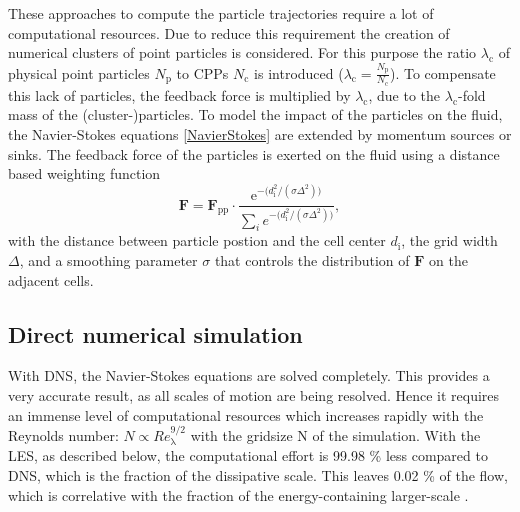 \documentclass[11pt,a4paper,openany,oneside,parskip=half*]{article}
\renewcommand*\vec[1]{\boldsymbol{#1}}
\begin{document}
\newline
These approaches to compute the particle trajectories require a lot of computational resources. 
\newline
Due to reduce this requirement the creation of numerical clusters of point particles is considered. For this purpose the ratio $\lambda_\mathrm{c}$ of physical point particles $N_\mathrm{p}$ to CPPs $N_\mathrm{c}$ is introduced ($\lambda_\mathrm{c} = \frac{N_\mathrm{p}}{N_\mathrm{c}}$). To compensate this lack of particles, the feedback force is multiplied by $\lambda_\mathrm{c}$, due to the $\lambda_\mathrm{c}$-fold mass of the (cluster-)particles.
\newline
To model the impact of the particles on the fluid, the Navier-Stokes equations \eqref{NavierStokes} are extended by momentum sources or sinks. The feedback force of the particles is exerted on the fluid using a distance based weighting function
\begin{equation}
\vec{F} = \vec{F}_\mathrm{pp} \cdot \frac{\mathrm{e}^{- \big(d_\mathrm{i}^\mathrm{2}/(\sigma \Delta^\mathrm{2})\big)}}{\sum \limits_{i} e^{- \big(d_\mathrm{i}^\mathrm{2}/(\sigma \Delta^\mathrm{2}) \big)}},
\end{equation}
with the distance between particle postion and the cell center $d_\mathrm{i}$, the grid width $\Delta$, and a smoothing parameter $\sigma$ that controls the distribution of $\vec{F}$ on the adjacent cells.
\newline
\subsection{Direct numerical simulation}
With DNS, the Navier-Stokes equations are solved completely. This provides a very accurate result, as all scales of motion are being resolved. Hence it requires an immense level of computational resources which increases rapidly with the Reynolds number: $N \propto Re_{\mathrm{\lambda}}^{9/2}$ with the gridsize N of the simulation. With the LES, as described below, the computational effort is 99.98 \% less compared to DNS, which is the fraction of the dissipative scale. This leaves 0.02 \% of the flow, which is correlative with the fraction of the energy-containing larger-scale \cite{turbulentFlows}.
\newline
\end{document}
